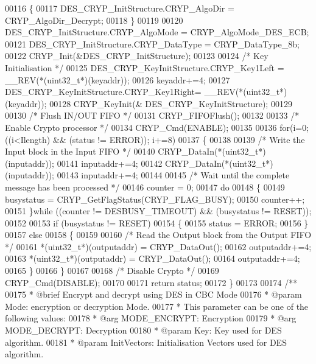 \begin{DoxyCode}
00116   \{
00117      DES\_CRYP\_InitStructure.CRYP_AlgoDir  = CRYP_AlgoDir_Decrypt;
00118   \}
00119 
00120   DES\_CRYP\_InitStructure.CRYP_AlgoMode = CRYP_AlgoMode_DES_ECB;
00121   DES\_CRYP\_InitStructure.CRYP_DataType = CRYP_DataType_8b;
00122   CRYP_Init(&DES\_CRYP\_InitStructure);
00123 
00124   \textcolor{comment}{/* Key Initialisation */}
00125   DES\_CRYP\_KeyInitStructure.CRYP\_Key1Left = \_\_REV(*(uint32\_t*)(keyaddr));
00126   keyaddr+=4;
00127   DES\_CRYP\_KeyInitStructure.CRYP\_Key1Right= \_\_REV(*(uint32\_t*)(keyaddr));
00128   CRYP_KeyInit(& DES\_CRYP\_KeyInitStructure);
00129 
00130   \textcolor{comment}{/* Flush IN/OUT FIFO */}
00131   CRYP_FIFOFlush();
00132 
00133   \textcolor{comment}{/* Enable Crypto processor */}
00134   CRYP_Cmd(ENABLE);
00135 
00136   \textcolor{keywordflow}{for}(i=0; ((i<Ilength) && (status != ERROR)); i+=8)
00137   \{
00138 
00139     \textcolor{comment}{/* Write the Input block in the Input FIFO */}
00140     CRYP\_DataIn(*(uint32\_t*)(inputaddr));
00141     inputaddr+=4;
00142     CRYP\_DataIn(*(uint32\_t*)(inputaddr));
00143     inputaddr+=4;
00144 
00145 \textcolor{comment}{/* Wait until the complete message has been processed */}
00146     counter = 0;
00147     \textcolor{keywordflow}{do}
00148     \{
00149       busystatus = CRYP\_GetFlagStatus(CRYP_FLAG_BUSY);
00150       counter++;
00151     \}\textcolor{keywordflow}{while} ((counter != DESBUSY_TIMEOUT) && (busystatus != RESET));
00152 
00153     \textcolor{keywordflow}{if} (busystatus != RESET)
00154    \{
00155        status = ERROR;
00156     \}
00157     \textcolor{keywordflow}{else}
00158     \{
00159 
00160       \textcolor{comment}{/* Read the Output block from the Output FIFO */}
00161       *(uint32\_t*)(outputaddr) = CRYP\_DataOut();
00162       outputaddr+=4;
00163       *(uint32\_t*)(outputaddr) = CRYP\_DataOut();
00164       outputaddr+=4;
00165     \}
00166   \}
00167 
00168   \textcolor{comment}{/* Disable Crypto */}
00169   CRYP_Cmd(DISABLE);
00170 
00171   \textcolor{keywordflow}{return} status;
00172 \}
00173 
00174 \textcolor{comment}{/**}
00175 \textcolor{comment}{  * @brief  Encrypt and decrypt using DES in CBC Mode}
00176 \textcolor{comment}{  * @param  Mode: encryption or decryption Mode.}
00177 \textcolor{comment}{  *          This parameter can be one of the following values:}
00178 \textcolor{comment}{  *            @arg MODE\_ENCRYPT: Encryption}
00179 \textcolor{comment}{  *            @arg MODE\_DECRYPT: Decryption}
00180 \textcolor{comment}{  * @param  Key: Key used for DES algorithm.}
00181 \textcolor{comment}{  * @param  InitVectors: Initialisation Vectors used for DES algorithm.}

\end{DoxyCode}

